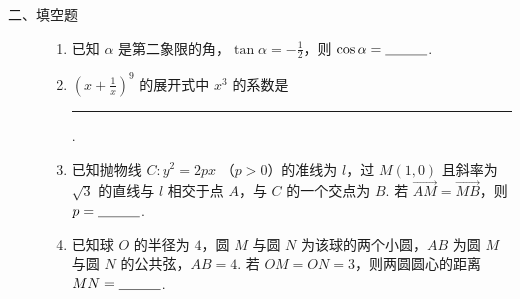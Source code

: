 \begin{description}

    \item[二、填空题]

    \begin{enumerate}[leftmargin=5pt]

      \addtocounter{enumi}{+12}

        \item 已知 \(\alpha\) 是第二象限的角，\(\tan \alpha = -\frac{1}{2}\)，则 \(\cos \alpha =\rule[-0.3ex]{3em}{0.4pt}\).

        \item \(\left(x + \frac{1}{x}\right)^9\) 的展开式中 \(x^3\) 的系数是\rule[-0.3ex]{3em}{0.4pt}.

        \item 已知抛物线 \(C: y^{2} = 2px\) （\(p > 0\)）的准线为 \(l\)，过 \(M(1,0)\) 且斜率为 \(\sqrt{3}\) 的直线与 \(l\) 相交于点 \(A\)，与 \(C\) 的一个交点为 \(B\). 若 \(\overrightarrow{AM} = \overrightarrow{MB}\)，则 \(p =\rule[-0.3ex]{3em}{0.4pt}\).

        \item 已知球 \(O\) 的半径为 \(4\)，圆 \(M\) 与圆 \(N\) 为该球的两个小圆，\(AB\) 为圆 \(M\) 与圆 \(N\) 的公共弦，\(AB = 4\). 若 \(OM = ON = 3\)，则两圆圆心的距离 \(MN =\rule[-0.3ex]{3em}{0.4pt}\).

    \end{enumerate}

\end{description}

